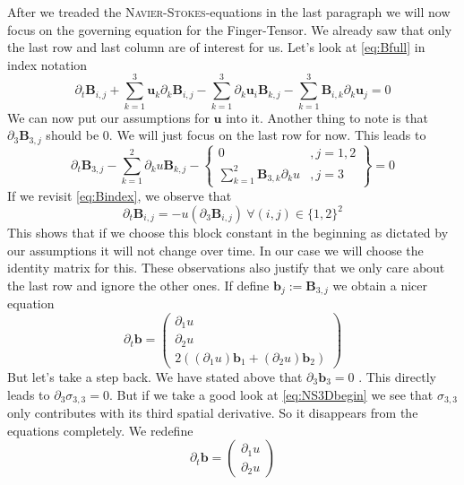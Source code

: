 \documentclass[12pt,a4paper]{scrartcl}
\numberwithin{equation}{section} %
\theoremstyle{definition}
\theoremstyle{plain}
\newcommand{\bfu}{\mathbf{u}}
\newcommand{\bfB}{\mathbf{B}}
\newcommand{\bfb}{\mathbf{b}}
\begin{document}
\par After we treaded the \textsc{Navier-Stokes}-equations in the last paragraph we will now focus on the governing equation for the Finger-Tensor. We already saw that only the last row and last column are of interest for us. Let's look at \eqref{eq:Bfull} in index notation
\begin{equation}
\label{eq:Bindex}
    \partial_t \mathbf{B}_{i,j}+\sum_{k=1}^3\mathbf{u}_k\partial_k \mathbf{B}_{i,j}-\sum_{k=1}^3\partial_k\mathbf{u}_i\mathbf{B}_{k,j}-\sum_{k=1}^3\mathbf{B}_{i,k}\partial_k\mathbf{u}_j=0
\end{equation}
We can now put our assumptions for $\bfu$ into it. Another thing to note is that $\partial_3\bfB_{3,j}$ should be $0$. We will just focus on the last row for now. This leads to
\begin{equation}
    \partial_t \mathbf{B}_{3,j} -\sum_{k=1}^2\partial_ku\mathbf{B}_{k,j}-\left.\begin{cases}
    0 &, j=1,2\\ \sum_{k=1}^2 \mathbf{B}_{3,k}\partial_ku &, j=3
    \end{cases}\right\} =0
\end{equation}
If we revisit \eqref{eq:Bindex}, we observe that
\begin{equation}
     \partial_t \mathbf{B}_{i,j}=-u(\partial_3 \mathbf{B}_{i,j})~\forall(i,j)\in\{1,2\}^2
\end{equation}
This shows that if we choose this block constant in the beginning as dictated by our assumptions it will not change over time. In our case we will choose the identity matrix for this. These observations also justify that we only care about the last row and ignore the other ones. If define $\bfb_j:=\bfB_{3,j}$ we obtain a nicer equation
\begin{equation}
   \partial_t \mathbf{b}=\begin{pmatrix}
   \partial_1u\\ \partial_2 u \\ 2\left((\partial_1 u)\mathbf{b}_1+(\partial_2 u)\mathbf{b}_2\right)
   \end{pmatrix}
\end{equation}
But let's take a step back. We have stated above that $\partial_3\bfb_3=0$ . This directly leads to $\partial_3\sigma_{3,3}=0$. But if we take a good look at \eqref{eq:NS3Dbegin} we see that $\sigma_{3,3}$ only contributes with its third spatial derivative. So it disappears from the equations completely. We redefine
\begin{equation}
\partial_t\bfb=
    \begin{pmatrix}
    \partial_1 u\\\partial_2 u
    \end{pmatrix}
\end{equation}
\end{document}
